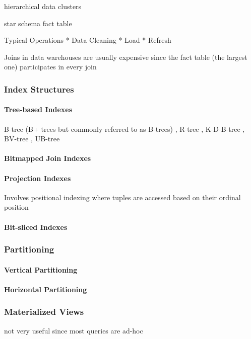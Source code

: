 \documentclass[12pt,a4paper]{article}
\begin{document}
hierarchical data clusters \cite{karayannidis2008hierarchical}

star schema
fact table

Typical Operations
    * Data Cleaning
    * Load
    * Refresh

Joins in data warehouses are usually expensive since the fact table (the largest one) participates in every join \cite{628286}

\subsubsection{Index Structures}
\paragraph{Tree-based Indexes}
B-tree (B+ trees but commonly referred to as B-trees) \cite{253268}, R-tree \cite{602266, Cheung20011}, K-D-B-tree \cite{582321}, BV-tree \cite{223796}, UB-tree
\cite{bayer1997universal}


\paragraph{Bitmapped Join Indexes}
\cite{212001}


\paragraph{Projection Indexes}
Involves positional indexing where tuples are accessed based on their ordinal position \cite{628286}

\paragraph{Bit-sliced Indexes}


\subsubsection{Partitioning}
\cite{thusoo2010data}
\paragraph{Vertical Partitioning}

\paragraph{Horizontal Partitioning}

\subsubsection{Materialized Views}
not very useful since most queries are ad-hoc \cite{653447}
\cite{355309}
\end{document}
